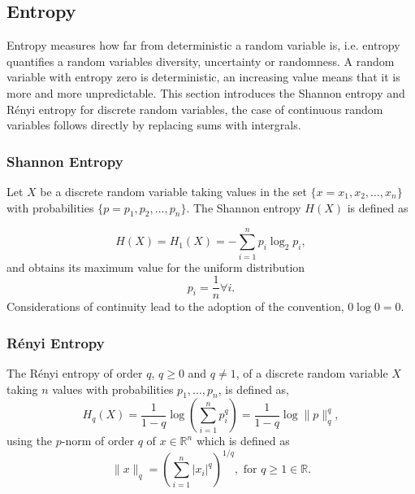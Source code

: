 \documentclass[12pt, twoside]{article}
\newcommand{\R}{\mathbb{R}}
\newcommand{\1}{\mathbb{1}}
\begin{document}
\subsection{Entropy}
Entropy measures how far from deterministic a random variable is, i.e. entropy quantifies a random variables diversity, uncertainty or randomness. 
A random variable with entropy zero is deterministic, an increasing value  means that it is more and more unpredictable.
This section introduces the Shannon entropy \citep{shannon} and R\'enyi entropy \citep{renyi1961measures} for discrete random variables, the case of continuous random variables follows directly by replacing sums with intergrals.
    
\subsubsection{Shannon Entropy}
Let $ X $ be a discrete random variable taking values in the set $ \{x = x_1, x_2, \ldots, x_n \} $ with probabilities $ \{p = p_1, p_2, \ldots, p_n \} $. The Shannon entropy $ H(X) $ is defined as 

\begin{equation}\label{Shannon1}
    H(X) = H_1(X) = - \sum_{i = 1} ^ n p_i \log_2 p_i,
\end{equation}
and obtains its maximum value for the uniform distribution
$$p_i = \frac{1}{n} \forall i.$$
Considerations of continuity lead to the adoption of the convention, $ 0 \log 0  = 0 $.

\subsubsection{R\'enyi Entropy}
The R\'enyi entropy of order $ q $, $ q  \geq 0 $ and $ q \neq 1 $, of a discrete random variable $ X $ taking $ n $ values with probabilities $ p_1, \ldots, p_n $, is defined as,
\begin{equation}
        H_q(X) = 
        \frac{1}{1 - q} \log \left( \sum_{i=1}^n p_i ^ {q} \right)
        = \frac{1}{1 - q} \log \| p \|_q^q,  
\end{equation}
using the $ p $-norm of order $ q $ of $ x  \in \R ^ n $  which is defined as   
$$ \| x \|_q = \left( \sum_{i=1}^n |x_i|^q \right)^{1/q}, \textrm{ for } q \geq 1 \in \R. $$
\end{document}
